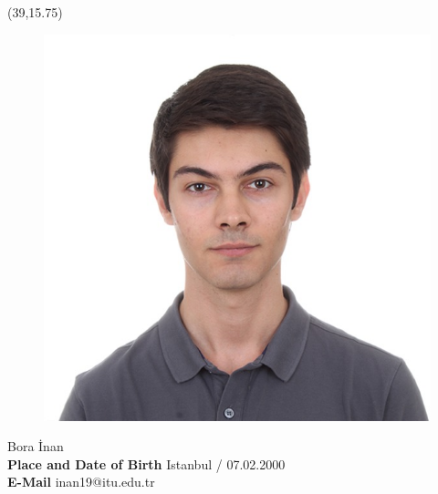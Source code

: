 \vspace*{10mm}
\setlength{\TPHorizModule}{10pt}
\setlength{\TPVertModule}{10pt}
\begin{textblock}{1}(39,15.75) %
	\begin{figure}[p]
		\includegraphics[scale=0.2,keepaspectratio=true]{cv-photo/bora.jpeg}
	\end{figure}	
\end{textblock}
\vspace*{20mm}
\textbf{\makebox[1.6cm]{\hfill \textbf{:}}}\hspace{0.225em} Bora İnan \\ %

\textbf{Place and Date of Birth\makebox[0.735cm]{\hfill \textbf{:}}}\hspace{0.225em} Istanbul / 07.02.2000\\ %

\textbf{E-Mail\makebox[3.685cm]{\hfill \textbf{:}}}\hspace{0.225em} inan19@itu.edu.tr\\ %

\vspace{5mm}

